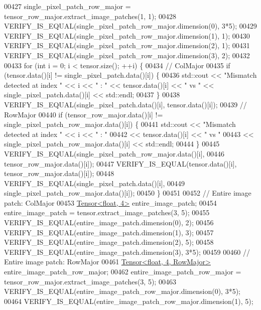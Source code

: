 \begin{DoxyCode}
00427   single\_pixel\_patch\_row\_major = tensor\_row\_major.extract\_image\_patches(1, 1);
00428   VERIFY\_IS\_EQUAL(single\_pixel\_patch\_row\_major.dimension(0), 3*5);
00429   VERIFY\_IS\_EQUAL(single\_pixel\_patch\_row\_major.dimension(1), 1);
00430   VERIFY\_IS\_EQUAL(single\_pixel\_patch\_row\_major.dimension(2), 1);
00431   VERIFY\_IS\_EQUAL(single\_pixel\_patch\_row\_major.dimension(3), 2);
00432 
00433   \textcolor{keywordflow}{for} (\textcolor{keywordtype}{int} i = 0; i < tensor.size(); ++i) \{
00434     \textcolor{comment}{// ColMajor}
00435     \textcolor{keywordflow}{if} (tensor.data()[i] != single\_pixel\_patch.data()[i]) \{
00436       std::cout << \textcolor{stringliteral}{"Mismatch detected at index "} << i << \textcolor{stringliteral}{" : "} << tensor.data()[i] << \textcolor{stringliteral}{" vs "} << 
      single\_pixel\_patch.data()[i] << std::endl;
00437     \}
00438     VERIFY\_IS\_EQUAL(single\_pixel\_patch.data()[i], tensor.data()[i]);
00439     \textcolor{comment}{// RowMajor}
00440     \textcolor{keywordflow}{if} (tensor\_row\_major.data()[i] != single\_pixel\_patch\_row\_major.data()[i]) \{
00441       std::cout << \textcolor{stringliteral}{"Mismatch detected at index "} << i << \textcolor{stringliteral}{" : "}
00442            << tensor.data()[i] << \textcolor{stringliteral}{" vs "}
00443            << single\_pixel\_patch\_row\_major.data()[i] << std::endl;
00444     \}
00445     VERIFY\_IS\_EQUAL(single\_pixel\_patch\_row\_major.data()[i],
00446                     tensor\_row\_major.data()[i]);
00447     VERIFY\_IS\_EQUAL(tensor.data()[i], tensor\_row\_major.data()[i]);
00448     VERIFY\_IS\_EQUAL(single\_pixel\_patch.data()[i],
00449                     single\_pixel\_patch\_row\_major.data()[i]);
00450   \}
00451 
00452   \textcolor{comment}{// Entire image patch: ColMajor}
00453   \hyperlink{class_eigen_1_1_tensor}{Tensor<float, 4>} entire\_image\_patch;
00454   entire\_image\_patch = tensor.extract\_image\_patches(3, 5);
00455   VERIFY\_IS\_EQUAL(entire\_image\_patch.dimension(0), 2);
00456   VERIFY\_IS\_EQUAL(entire\_image\_patch.dimension(1), 3);
00457   VERIFY\_IS\_EQUAL(entire\_image\_patch.dimension(2), 5);
00458   VERIFY\_IS\_EQUAL(entire\_image\_patch.dimension(3), 3*5);
00459 
00460   \textcolor{comment}{// Entire image patch: RowMajor}
00461   \hyperlink{class_eigen_1_1_tensor}{Tensor<float, 4, RowMajor>} entire\_image\_patch\_row\_major;
00462   entire\_image\_patch\_row\_major = tensor\_row\_major.extract\_image\_patches(3, 5);
00463   VERIFY\_IS\_EQUAL(entire\_image\_patch\_row\_major.dimension(0), 3*5);
00464   VERIFY\_IS\_EQUAL(entire\_image\_patch\_row\_major.dimension(1), 5);

\end{DoxyCode}
